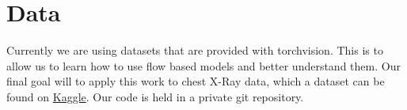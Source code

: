 \section{Data}
Currently we are using datasets that are provided with torchvision. This is to
allow us to learn how to use flow based models and better understand them. Our
final goal will to apply this work to chest X-Ray data, which a dataset can be
found on
\href{https://www.kaggle.com/paultimothymooney/chest-xray-pneumonia}{Kaggle}. Our
code is held in a private git repository.
